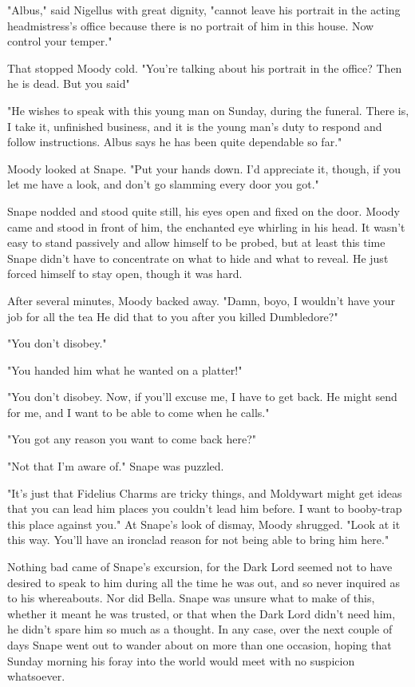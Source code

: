 "Albus," said Nigellus with great dignity, "cannot leave his portrait in the acting headmistress's office because there is no portrait of him in this house. Now control your temper."

That stopped Moody cold. "You're talking about his portrait in the office? Then he is dead. But you said{\el}"

"He wishes to speak with this young man on Sunday, during the funeral. There is, I take it, unfinished business, and it is the young man's duty to respond and follow instructions. Albus says he has been quite dependable so far."

Moody looked at Snape. "Put your hands down. I'd appreciate it, though, if you let me have a look, and don't go slamming every door you got."

Snape nodded and stood quite still, his eyes open and fixed on the door. Moody came and stood in front of him, the enchanted eye whirling in his head. It wasn't easy to stand passively and allow himself to be probed, but at least this time Snape didn't have to concentrate on what to hide and what to reveal. He just forced himself to stay open, though it was hard.

After several minutes, Moody backed away. "Damn, boyo, I wouldn't have your job for all the tea{\el} He did that to you after you killed Dumbledore?"

"You don't disobey."

"You handed him what he wanted on a platter!"

"You don't disobey. Now, if you'll excuse me, I have to get back. He might send for me, and I want to be able to come when he calls."

"You got any reason you want to come back here?"

"Not that I'm aware of." Snape was puzzled.

"It's just that Fidelius Charms are tricky things, and Moldywart might get ideas that you can lead him places you couldn't lead him before. I want to booby-trap this place against you." At Snape's look of dismay, Moody shrugged. "Look at it this way. You'll have an ironclad reason for not being able to bring him here."

Nothing bad came of Snape's excursion, for the Dark Lord seemed not to have desired to speak to him during all the time he was out, and so never inquired as to his whereabouts. Nor did Bella. Snape was unsure what to make of this, whether it meant he was trusted, or that when the Dark Lord didn't need him, he didn't spare him so much as a thought. In any case, over the next couple of days Snape went out to wander about on more than one occasion, hoping that Sunday morning his foray into the world would meet with no suspicion whatsoever.

